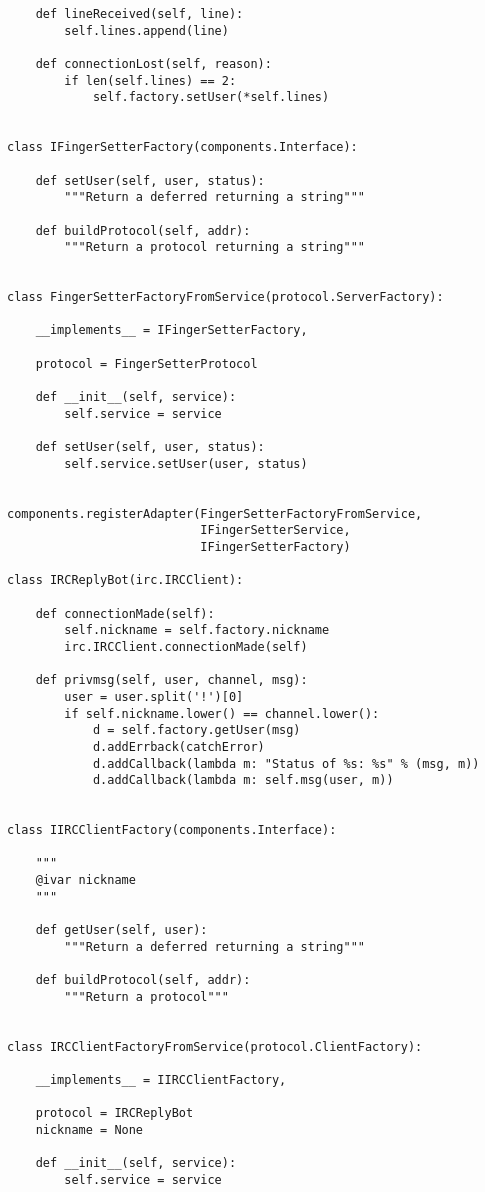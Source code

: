 \begin{verbatim}
    def lineReceived(self, line):
        self.lines.append(line)

    def connectionLost(self, reason):
        if len(self.lines) == 2:
            self.factory.setUser(*self.lines)


class IFingerSetterFactory(components.Interface):

    def setUser(self, user, status):
        """Return a deferred returning a string"""

    def buildProtocol(self, addr):
        """Return a protocol returning a string"""


class FingerSetterFactoryFromService(protocol.ServerFactory):

    __implements__ = IFingerSetterFactory,

    protocol = FingerSetterProtocol

    def __init__(self, service):
        self.service = service

    def setUser(self, user, status):
        self.service.setUser(user, status)


components.registerAdapter(FingerSetterFactoryFromService,
                           IFingerSetterService,
                           IFingerSetterFactory)

class IRCReplyBot(irc.IRCClient):

    def connectionMade(self):
        self.nickname = self.factory.nickname
        irc.IRCClient.connectionMade(self)

    def privmsg(self, user, channel, msg):
        user = user.split('!')[0]
        if self.nickname.lower() == channel.lower():
            d = self.factory.getUser(msg)
            d.addErrback(catchError)
            d.addCallback(lambda m: "Status of %s: %s" % (msg, m))
            d.addCallback(lambda m: self.msg(user, m))


class IIRCClientFactory(components.Interface):

    """
    @ivar nickname
    """

    def getUser(self, user):
        """Return a deferred returning a string"""

    def buildProtocol(self, addr):
        """Return a protocol"""


class IRCClientFactoryFromService(protocol.ClientFactory):

    __implements__ = IIRCClientFactory,

    protocol = IRCReplyBot
    nickname = None

    def __init__(self, service):
        self.service = service


\end{verbatim}
